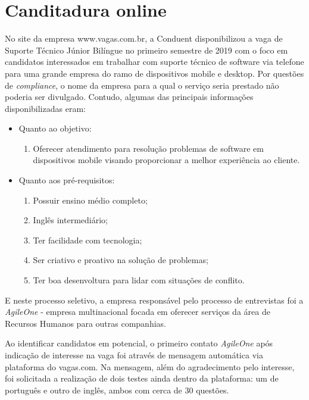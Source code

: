 \documentclass[12pt]{article}
\begin{document}
\section {Canditadura online}
 
No site da empresa www.vagas.com.br, a Conduent disponibilizou a vaga de Suporte Técnico Júnior Bilíngue no primeiro semestre de 2019 com o foco em candidatos interessados em trabalhar com suporte técnico de software via telefone para uma grande empresa do ramo de dispositivos mobile e desktop. Por questões de  \emph {compliance}, o nome da empresa para a qual o serviço seria prestado não poderia ser divulgado. Contudo, algumas das principais informações disponibilizadas eram: 
 
 \newpage
 
  \begin{itemize}
\item Quanto ao objetivo:
	\begin{enumerate}
	\item Oferecer atendimento para resolução problemas de software em dispositivos mobile 	visando proporcionar a melhor experiência ao cliente.
	\end{enumerate}
\end{itemize}


 \begin{itemize}
\item Quanto aos pré-requisitos:
	\begin{enumerate}
   	\item Possuir ensino médio completo;
	\item Inglês intermediário;
   	\item Ter facilidade com tecnologia; 
   	\item Ser criativo e proativo na solução de problemas; 
   	\item Ter boa desenvoltura para lidar com situações de conflito. 
	\end{enumerate}
\end{itemize}

E neste processo seletivo, a empresa responsável pelo processo de entrevistas foi a \emph {AgileOne} - empresa multinacional focada em oferecer serviços da área de Recursos Humanos para outras companhias.

Ao identificar candidatos em potencial, o primeiro contato  \emph {AgileOne} após indicação de interesse na vaga foi através de mensagem automática  via plataforma do vagas.com. Na mensagem, além do agradecimento pelo interesse, foi solicitada a realização de dois testes ainda dentro da plataforma: um de português e outro de inglês, ambos com cerca de 30 questões.
\end{document}

